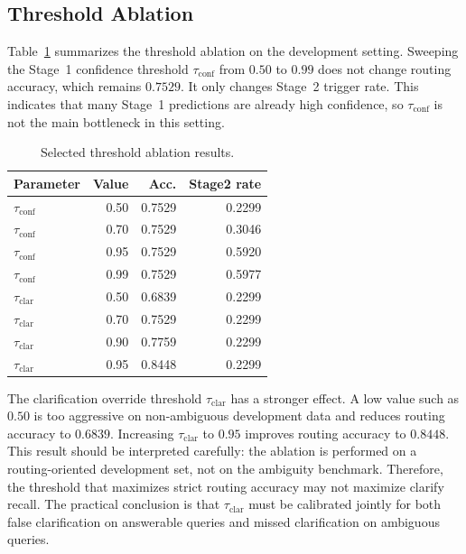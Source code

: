 \documentclass[11pt,twocolumn]{article}
\begin{document}
\subsection{Threshold Ablation}
\label{subsec:ablation_results}

Table~\ref{tab:threshold_ablation} summarizes the threshold
ablation on the development setting. Sweeping the Stage~1
confidence threshold $\tau_{\mathrm{conf}}$ from $0.50$ to $0.99$ does not
change routing accuracy, which remains $0.7529$. It only
changes Stage~2 trigger rate. This indicates that many
Stage~1 predictions are already high confidence, so
$\tau_{\mathrm{conf}}$ is not the main bottleneck in this setting.

\begin{table}[!htbp]
\centering
\caption{Selected threshold ablation results.}
\label{tab:threshold_ablation}
\small
\setlength{\tabcolsep}{3.5pt}
\begin{tabular}{lrrr}
\toprule
\textbf{Parameter} & \textbf{Value} & \textbf{Acc.} & \textbf{Stage2 rate} \\
\midrule
$\tau_{\mathrm{conf}}$ & 0.50 & 0.7529 & 0.2299 \\
$\tau_{\mathrm{conf}}$ & 0.70 & 0.7529 & 0.3046 \\
$\tau_{\mathrm{conf}}$ & 0.95 & 0.7529 & 0.5920 \\
$\tau_{\mathrm{conf}}$ & 0.99 & 0.7529 & 0.5977 \\
\midrule
$\tau_{\mathrm{clar}}$ & 0.50 & 0.6839 & 0.2299 \\
$\tau_{\mathrm{clar}}$ & 0.70 & 0.7529 & 0.2299 \\
$\tau_{\mathrm{clar}}$ & 0.90 & 0.7759 & 0.2299 \\
$\tau_{\mathrm{clar}}$ & 0.95 & 0.8448 & 0.2299 \\
\bottomrule
\end{tabular}
\end{table}

The clarification override threshold $\tau_{\mathrm{clar}}$ has a stronger effect. A
low value such as $0.50$ is too aggressive on non-ambiguous
development data and reduces routing accuracy to $0.6839$.
Increasing $\tau_{\mathrm{clar}}$ to $0.95$ improves routing accuracy to
$0.8448$. This result should be interpreted carefully: the
ablation is performed on a routing-oriented development set,
not on the ambiguity benchmark. Therefore, the threshold that
maximizes strict routing accuracy may not maximize clarify
recall. The practical conclusion is that $\tau_{\mathrm{clar}}$ must be
calibrated jointly for both false clarification on answerable
queries and missed clarification on ambiguous queries.
\end{document}
